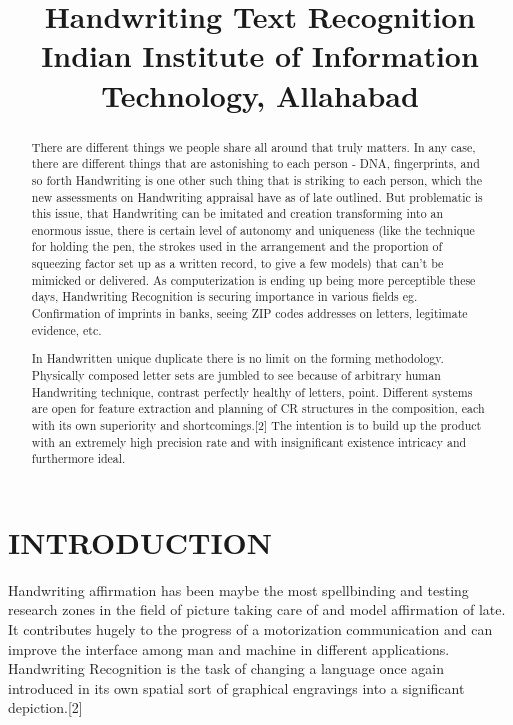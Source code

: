 \documentclass[12pt, conference]{IEEEtran}
\begin{document}
\title{
\huge Handwriting Text Recognition \\
{\Large Indian Institute of Information Technology, Allahabad\\}}

\author{
\date{}
}
\maketitle

\begin{abstract}
There are different things we people share all around that truly matters. In any case, there are different things that are astonishing to each person - DNA, fingerprints, and so forth Handwriting is one other such thing that is striking to each person, which the new assessments on Handwriting appraisal have as of late outlined. But problematic is this issue, that Handwriting can be imitated and creation transforming into an enormous issue, there is certain level of autonomy and uniqueness (like the technique for holding the pen, the strokes used in the arrangement and the proportion of squeezing factor set up as a written record, to give a few models) that can't be mimicked or delivered. As computerization is ending up being more perceptible these days, Handwriting Recognition is securing importance in various fields eg. Confirmation of imprints in banks, seeing ZIP codes addresses on letters, legitimate
evidence, etc.

In Handwritten unique duplicate there is no limit on the forming methodology. Physically composed letter sets are jumbled to see because of arbitrary human Handwriting technique, contrast perfectly healthy of letters, point. Different systems are open for feature extraction and planning of CR structures in the composition, each with its own superiority and shortcomings.[2] The intention is to build up the product with an extremely high precision rate and with insignificant existence intricacy and furthermore ideal.\\
\end{abstract}

\section{\textbf{INTRODUCTION}}
Handwriting affirmation has been maybe the most spellbinding and testing research zones in the field of picture taking care of and model affirmation of late. It contributes hugely to the progress of a motorization communication and can improve the interface among man and machine in different applications. Handwriting Recognition is the task of changing a language once again introduced in its own spatial sort of graphical engravings into a significant depiction.[2]
\end{document}
